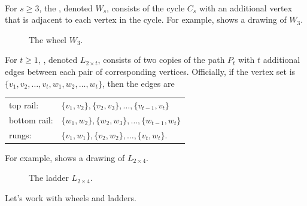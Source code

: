 \begin{defn}
\label{defn_wheel_ladder}
~
    \begin{apart}
        \item For $s \ge 3$, the , denoted $W_s$, consists of the cycle $C_s$ with an additional  vertex that is adjacent to each vertex in the cycle. For example,  shows a drawing of $W_3$.
            \begin{figure}[hbtp]
                \centering
                
                \caption{The wheel $W_3$.}
                \label{fig_W3}
            \end{figure}
        
        \item For $t \ge 1$, , denoted $L_{2\times t}$, consists of two copies of the path $P_t$ with $t$ additional edges between each pair of corresponding vertices.  Officially, if the vertex set is $\{v_1,v_2,\ldots,v_t,w_1,w_2,\ldots,w_t\}$, then the edges are
        
            \begin{center}
            \begin{tabular}{ll}
               top rail: & $\{v_1,v_2\}, \{v_2,v_3\}, \ldots, \{v_{t-1},v_t\}$ \\
               bottom rail: & $\{w_1,w_2\}, \{w_2,w_3\}, \ldots, \{w_{t-1},w_t\}$ \\
               rungs: & $\{v_1,w_1\}, \{v_2,w_2\}, \ldots, \{v_t,w_t\}.$
            \end{tabular}
            \end{center}
        For example,  shows a drawing of $L_{2 \times 4}$.
            \begin{figure}[hbtp]
                \centering
                
                \caption{The ladder $L_{2 \times 4}$.}
                \label{fig_L2x4}
            \end{figure}
    \end{apart}
\end{defn}

Let's work with wheels and ladders.

